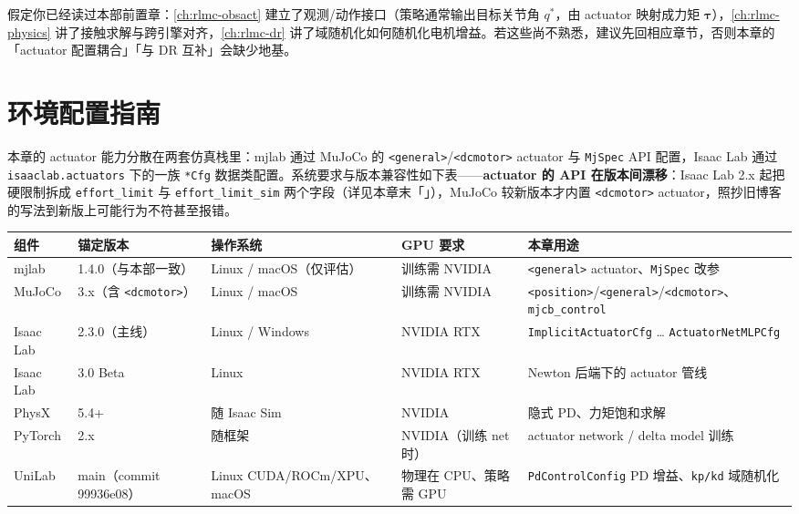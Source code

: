 假定你已经读过本部前置章：\cref{ch:rlmc-obsact} 建立了观测/动作接口（策略通常输出目标关节角 $q^*$，由 actuator 映射成力矩 $\boldsymbol\tau$），\cref{ch:rlmc-physics} 讲了接触求解与跨引擎对齐，\cref{ch:rlmc-dr} 讲了域随机化如何随机化电机增益。若这些尚不熟悉，建议先回相应章节，否则本章的「actuator 配置耦合」「与 DR 互补」会缺少地基。

\section*{环境配置指南}
\label{sec:rlmc-act-env}

本章的 actuator 能力分散在两套仿真栈里：mjlab 通过 MuJoCo 的 \verb|<general>|/\verb|<dcmotor>| actuator 与 \verb|MjSpec| API 配置，Isaac Lab 通过 \verb|isaaclab.actuators| 下的一族 \verb|*Cfg| 数据类配置。系统要求与版本兼容性如下表——\textbf{actuator 的 API 在版本间漂移}：Isaac Lab 2.x 起把硬限制拆成 \verb|effort_limit| 与 \verb|effort_limit_sim| 两个字段（详见本章末「」），MuJoCo 较新版本才内置 \verb|<dcmotor>| actuator，照抄旧博客的写法到新版上可能行为不符甚至报错。

\begin{center}
\small
\begin{tabular}{@{}lllll@{}}
\toprule
组件 & 锚定版本 & 操作系统 & GPU 要求 & 本章用途 \\
\midrule
mjlab & 1.4.0（与本部一致） & Linux / macOS（仅评估） & 训练需 NVIDIA & \verb|<general>| actuator、\verb|MjSpec| 改参 \\
MuJoCo & 3.x（含 \verb|<dcmotor>|） & Linux / macOS & 训练需 NVIDIA & \verb|<position>|/\verb|<general>|/\verb|<dcmotor>|、\verb|mjcb_control| \\
Isaac Lab & 2.3.0（主线） & Linux / Windows & NVIDIA RTX & \verb|ImplicitActuatorCfg| … \verb|ActuatorNetMLPCfg| \\
Isaac Lab & 3.0 Beta & Linux & NVIDIA RTX & Newton 后端下的 actuator 管线 \\
PhysX & 5.4+ & 随 Isaac Sim & NVIDIA & 隐式 PD、力矩饱和求解 \\
PyTorch & 2.x & 随框架 & NVIDIA（训练 net 时） & actuator network / delta model 训练 \\
UniLab & main（commit 99936e08） & Linux CUDA/ROCm/XPU、macOS & 物理在 CPU、策略需 GPU & \verb|PdControlConfig| PD 增益、\verb|kp/kd| 域随机化 \\
\bottomrule
\end{tabular}
\end{center}

